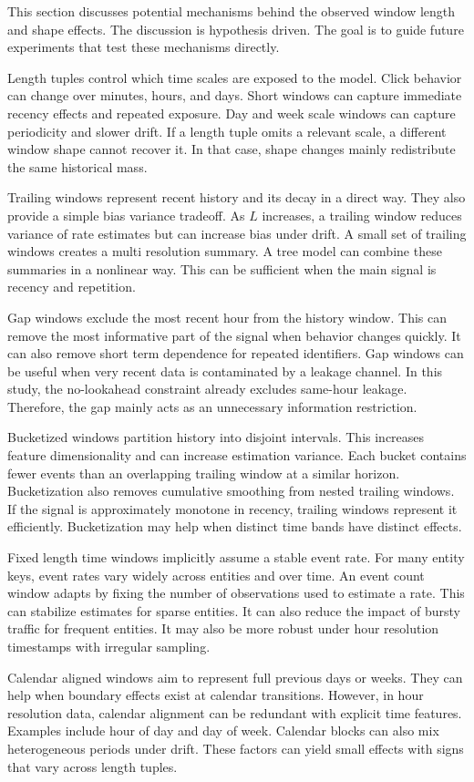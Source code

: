 This section discusses potential mechanisms behind the observed window length and shape effects.
The discussion is hypothesis driven.
The goal is to guide future experiments that test these mechanisms directly.

Length tuples control which time scales are exposed to the model.
Click behavior can change over minutes, hours, and days.
Short windows can capture immediate recency effects and repeated exposure.
Day and week scale windows can capture periodicity and slower drift.
If a length tuple omits a relevant scale, a different window shape cannot recover it.
In that case, shape changes mainly redistribute the same historical mass.

Trailing windows represent recent history and its decay in a direct way.
They also provide a simple bias variance tradeoff.
As $L$ increases, a trailing window reduces variance of rate estimates but can increase bias under drift.
A small set of trailing windows creates a multi resolution summary.
A tree model can combine these summaries in a nonlinear way.
This can be sufficient when the main signal is recency and repetition.

Gap windows exclude the most recent hour from the history window.
This can remove the most informative part of the signal when behavior changes quickly.
It can also remove short term dependence for repeated identifiers.
Gap windows can be useful when very recent data is contaminated by a leakage channel.
In this study, the no-lookahead constraint already excludes same-hour leakage.
Therefore, the gap mainly acts as an unnecessary information restriction.

Bucketized windows partition history into disjoint intervals.
This increases feature dimensionality and can increase estimation variance.
Each bucket contains fewer events than an overlapping trailing window at a similar horizon.
Bucketization also removes cumulative smoothing from nested trailing windows.
If the signal is approximately monotone in recency, trailing windows represent it efficiently.
Bucketization may help when distinct time bands have distinct effects.

Fixed length time windows implicitly assume a stable event rate.
For many entity keys, event rates vary widely across entities and over time.
An event count window adapts by fixing the number of observations used to estimate a rate.
This can stabilize estimates for sparse entities.
It can also reduce the impact of bursty traffic for frequent entities.
It may also be more robust under hour resolution timestamps with irregular sampling.

Calendar aligned windows aim to represent full previous days or weeks.
They can help when boundary effects exist at calendar transitions.
However, in hour resolution data, calendar alignment can be redundant with explicit time features.
Examples include hour of day and day of week.
Calendar blocks can also mix heterogeneous periods under drift.
These factors can yield small effects with signs that vary across length tuples.
